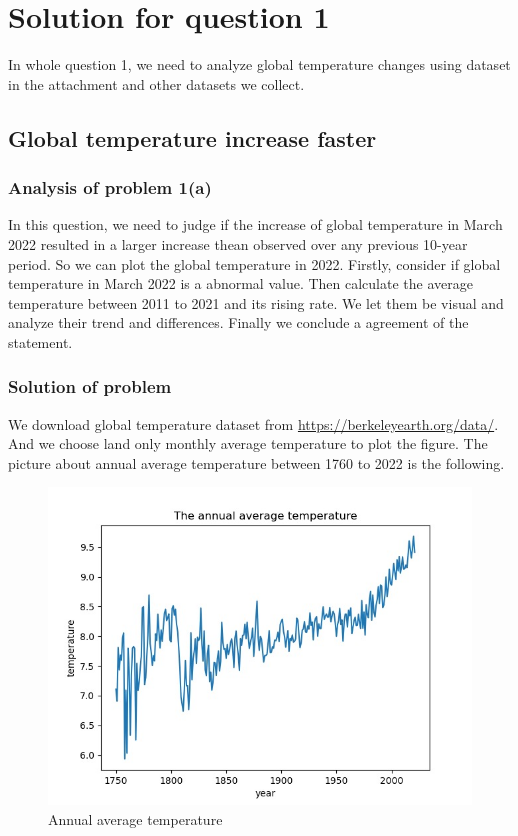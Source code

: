 \documentclass{apmcmthesis}
\begin{document}
  \section{Solution for question 1}
  In whole question 1, we need to analyze global temperature changes using dataset in the attachment and other datasets we collect.
  
  \subsection{Global temperature increase faster}
  \subsubsection{Analysis of problem 1(a)}
  In this question, we need to judge if the increase of global temperature in March 2022 resulted in a larger increase thean observed over any previous 10-year period. 
  So we can plot the global temperature in 2022.
  Firstly, consider if global temperature in March 2022 is a abnormal value. 
  Then calculate the average temperature between 2011 to 2021 and its rising rate.
  We let them be visual and analyze their trend and differences. 
  Finally we conclude a agreement of the statement. 
  
  \subsubsection{Solution of problem}
  We download global temperature dataset from \url{https://berkeleyearth.org/data/}.
  And we choose land only monthly average temperature to plot the figure. 
  The picture about annual average temperature between 1760 to 2022 is the following.
  
  \begin{figure}[htbp]
    \centering
    \includegraphics[scale=0.4]{annual avg tem.jpg}
    \caption{Annual average temperature}
  \end{figure}
  
\end{document}
